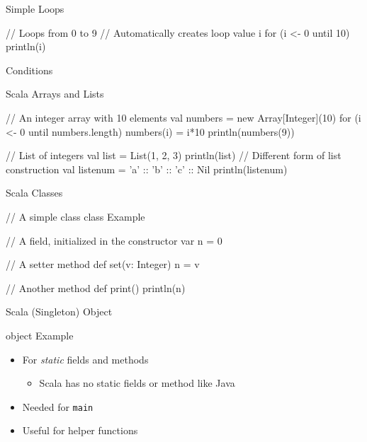 \documentclass[xcolor=pdflatex,dvipsnames,table]{beamer}
\newcommand{\code}[1]{{\texttt{#1}}}
\begin{document}
\begin{frame}[fragile]{Simple Loops}
\begin{chisel}
// Loops from 0 to 9
// Automatically creates loop value i
for (i <- 0 until 10) {
  println(i)
}
\end{chisel}
\end{frame}

\begin{frame}[fragile]{Conditions}
\end{frame}

\begin{frame}[fragile]{Scala Arrays and Lists}
\begin{chisel}
// An integer array with 10 elements
val numbers = new Array[Integer](10)
for (i <- 0 until numbers.length) {
  numbers(i) = i*10
}
println(numbers(9))


// List of integers
val list = List(1, 2, 3)
println(list)
// Different form of list construction
val listenum = 'a' :: 'b' :: 'c' :: Nil
println(listenum)
\end{chisel}
\end{frame}


\begin{frame}[fragile]{Scala Classes}
\begin{chisel}
// A simple class
class Example {
  // A field, initialized in the constructor
  var n = 0
  
  // A setter method
  def set(v: Integer) {
    n = v
  }
  
  // Another method
  def print() {
    println(n)
  }
}
\end{chisel}
\end{frame}

\begin{frame}[fragile]{Scala (Singleton) Object}
\begin{chisel}
object Example {}
\end{chisel}
\begin{itemize}
\item For \emph{static} fields and methods
\begin{itemize}
\item Scala has no static fields or method like Java
\end{itemize}
\item Needed for \code{main}
\item Useful for helper functions
\end{itemize}
\end{frame}
\end{document}
